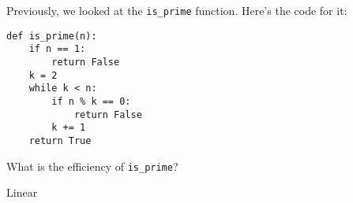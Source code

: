 \begin{blocksection}
\question Previously, we looked at the \texttt{is\_prime} function. Here's the code for it:

\begin{blocksection}
\begin{lstlisting}
def is_prime(n):
    if n == 1:
        return False
    k = 2
    while k < n:
        if n % k == 0:
            return False
        k += 1
    return True
\end{lstlisting}
\end{blocksection}

What is the efficiency of \texttt{is\_prime}?

\begin{solution} [0.5in]
    Linear
\end{solution}
\end{blocksection}
